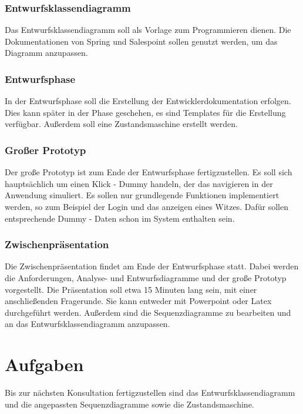 \documentclass{scrartcl}
\begin{document}
\subsubsection{Entwurfsklassendiagramm}
Das Entwurfsklassendiagramm soll als Vorlage zum Programmieren dienen. Die Dokumentationen von Spring und Salespoint sollen genutzt werden, um das Diagramm anzupassen.
\subsubsection{Entwurfsphase}
In der Entwurfsphase soll die Erstellung der Entwicklerdokumentation erfolgen. Dies kann sp\"ater in der Phase geschehen, es sind Templates für die Erstellung verf\"ugbar. Außerdem soll eine Zustandsmaschine erstellt werden.
\subsubsection{Gro\ss{}er Prototyp}
Der große Prototyp ist zum Ende der Entwurfsphase fertigzustellen. Es soll sich haupts\"achlich um einen Klick - Dummy handeln, der das navigieren in der Anwendung simuliert. Es sollen nur grundlegende Funktionen implementiert werden, so zum Beispiel der Login und das anzeigen eines Witzes. Dafür sollen entsprechende Dummy - Daten schon im System enthalten sein.
\subsubsection{Zwischenpr\"asentation}
Die Zwischenpr\"asentation findet am Ende der Entwurfsphase statt. Dabei werden die Anforderungen, Analyse- und Entwurfsdiagramme und der große Prototyp vorgestellt. Die Pr\"asentation soll etwa 15 Minuten lang sein, mit einer anschließenden Fragerunde. Sie kann entweder mit Powerpoint oder Latex durchgeführt werden. Außerdem sind die Sequenzdiagramme zu bearbeiten und an das Entwurfsklassendiagramm anzupassen.
\vspace*{1em}

\section{Aufgaben}
Bis zur n\"achsten Konsultation fertigzustellen sind das Entwurfsklassendiagramm und die angepassten Sequenzdiagramme sowie die Zustandsmaschine.
\end{document}
